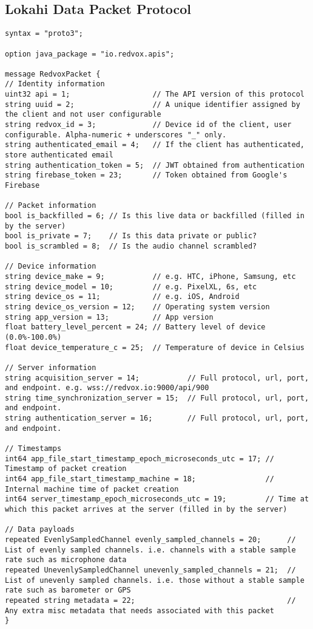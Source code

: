 \subsection{Lokahi Data Packet Protocol}
\label{lokahi-data-packet-protocol}
\begin{verbatim}
syntax = "proto3";

option java_package = "io.redvox.apis";

message RedvoxPacket {
// Identity information
uint32 api = 1;                   // The API version of this protocol
string uuid = 2;                  // A unique identifier assigned by the client and not user configurable
string redvox_id = 3;             // Device id of the client, user configurable. Alpha-numeric + underscores "_" only.
string authenticated_email = 4;   // If the client has authenticated, store authenticated email
string authentication_token = 5;  // JWT obtained from authentication
string firebase_token = 23;       // Token obtained from Google's Firebase

// Packet information
bool is_backfilled = 6; // Is this live data or backfilled (filled in by the server)
bool is_private = 7;    // Is this data private or public?
bool is_scrambled = 8;  // Is the audio channel scrambled?

// Device information
string device_make = 9;           // e.g. HTC, iPhone, Samsung, etc
string device_model = 10;         // e.g. PixelXL, 6s, etc
string device_os = 11;            // e.g. iOS, Android
string device_os_version = 12;    // Operating system version
string app_version = 13;          // App version
float battery_level_percent = 24; // Battery level of device (0.0%-100.0%)
float device_temperature_c = 25;  // Temperature of device in Celsius

// Server information
string acquisition_server = 14;           // Full protocol, url, port, and endpoint. e.g. wss://redvox.io:9000/api/900
string time_synchronization_server = 15;  // Full protocol, url, port, and endpoint.
string authentication_server = 16;        // Full protocol, url, port, and endpoint.

// Timestamps
int64 app_file_start_timestamp_epoch_microseconds_utc = 17; // Timestamp of packet creation
int64 app_file_start_timestamp_machine = 18;                // Internal machine time of packet creation
int64 server_timestamp_epoch_microseconds_utc = 19;         // Time at which this packet arrives at the server (filled in by the server)

// Data payloads
repeated EvenlySampledChannel evenly_sampled_channels = 20;      // List of evenly sampled channels. i.e. channels with a stable sample rate such as microphone data
repeated UnevenlySampledChannel unevenly_sampled_channels = 21;  // List of unevenly sampled channels. i.e. those without a stable sample rate such as barometer or GPS
repeated string metadata = 22;                                   // Any extra misc metadata that needs associated with this packet
}


\end{verbatim}
